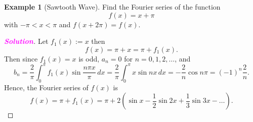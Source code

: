 \documentclass[12pt,openany]{book}
\theoremstyle{definition}
\newtheorem{example}{Example}[chapter]
\newcommand{\sol}{\textcolor{magenta}{\bf Solution}}
\begin{document}
	\newpage
	\begin{example}[Sawtooth Wave]
		Find the Fourier series of the function
		\[
		f(x) = x + \pi
		\]
		with \(-\pi < x < \pi\) and \(f(x + 2\pi) = f(x)\).
		\begin{proof}[\sol]
			Let $f_1(x):=x$ then
			\[
			f(x) = \pi + x = \pi + f_1(x).
			\]
			Then since \(f_1(x) = x\) is odd, \(a_n = 0\) for \(n = 0,1,2,\ldots\), and
			\[
			b_n = \frac{2}{\pi} \int_{0}^{\pi} f_1(x) \sin \frac{n\pi x}{\pi}\,dx = \frac{2}{\pi} \int_{0}^{\pi} x \sin nx\,dx = -\frac{2}{n} \cos n\pi = (-1)^n \frac{2}{n}.
			\]
			Hence, the Fourier series of \(f(x)\) is
			\[
			f(x) = \pi + f_1(x) = \pi + 2\left( \sin x - \frac{1}{2} \sin 2x + \frac{1}{3} \sin 3x - \ldots \right).
			\]
		\end{proof}
	\end{example}
	
	\newpage
\end{document}
